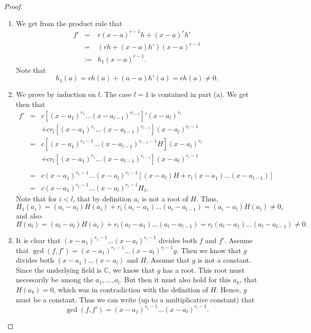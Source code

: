 \begin{proof}
\begin{enumerate}
    \item We get from the product rule that
    \begin{eqnarray*}
        f'
        & = & r(x-a)^{r-1} h + (x-a)^r h'\\
        & = & (rh + (x-a) h') (x-a)^{r-1}\\
        & := & h_1 (x-a)^{r-1}.
    \end{eqnarray*}
    Note that
    $$h_1(a) = rh(a) + (a-a)h'(a) = rh(a)\neq 0.$$
    \item We prove by induction on $l$. The case $l=1$ is contained in part (a). We get then that
    \begin{eqnarray*}
        f'
        & = & c\left[(x-a_1)^{r_1} ... (x-a_{l-1})^{r_{l-1}}\right]' (x-a_l)^{r_l}\\
        & & + cr_l \left[(x-a_1)^{r_1} ... (x-a_{l-1})^{r_{l-1}}\right] (x-a_l)^{r_l-1}\\
        & = & c\left[(x-a_1)^{r_1-1}\dots(x-a_{l-1})^{r_{l-1}-1}H\right] (x-a_l)^{r_l}\\
        & & + cr_l \left[(x-a_1)^{r_1} ... (x-a_{l-1})^{r_{l-1}}\right] (x-a_l)^{r_l-1}\\\\
        & = & c(x-a_1)^{r_1-1}\dots(x-a_l)^{r_l-1} \left[ (x-a_l)H +r_l (x-a_1) ... (x-a_{l-1})\right]\\
        & = & c(x-a_1)^{r_1-1}\dots(x-a_l)^{r_l-1} H_1.
    \end{eqnarray*}
    Note that for $i<l$, that by definition $a_i$ is not a root of $H$. Thus,
    $$H_1(a_i) = (a_i-a_l)H(a_i) + r_l(a_i-a_1) ... (a_i-a_{l-1}) = (a_i - a_l)H(a_i)\neq 0,$$
    and also
    $$H(a_l) = (a_l-a_l)H(a_i) + r_l(a_l-a_1) ... (a_l-a_{l-1})= r_l(a_l-a_1) ... (a_l-a_{l-1}) \neq 0.$$
    \item It is clear that $(x-a_1)^{r_1 - 1} ... (x - a_l)^{r_l -1}$ divides both $f$ and $f'$. Assume that $\gcd(f,f') = (x-a_1)^{r_1 - 1} ... (x - a_l)^{r_l -1} g$. Then we know that $g$ divides both $(x-a_1)...(x-a_l)$ and $H$. Assume that $g$ is not a constant. Since the underlying field is $\mathbb{C}$, we know that $g$ has a root. This root must necessarily be among the $a_1,...,a_l$. But then it must also hold for this $a_k$, that $H(a_k) = 0$, which was in contradiction with the definition of $H$. Hence, $g$ must be a constant. Thus we can write (up to a multiplicative constant) that
    $$\gcd(f,f') = (x-a_1)^{r_1 - 1} ... (x - a_l)^{r_l -1}.$$
\end{enumerate}
\end{proof}

